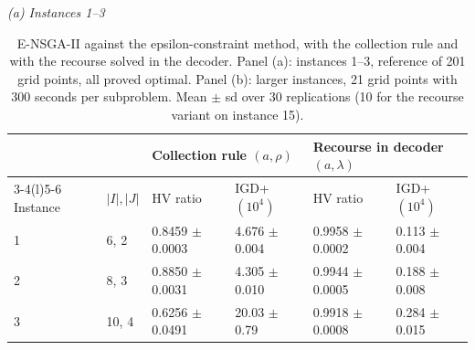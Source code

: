 \documentclass[11pt, a4paper]{article}
\begin{document}
\hypertarget{tab:Exact}{}
\begin{table}[!htb]
\centering
\small
{}
\caption{E-NSGA-II against the epsilon-constraint method, with the collection rule and with the recourse solved in the decoder. Panel (a): instances 1--3, reference of 201 grid points, all proved optimal. Panel (b): larger instances, 21 grid points with 300 seconds per subproblem. Mean $\pm$ sd over 30 replications (10 for the recourse variant on instance 15).}
\label{tab:Exact}
\textit{(a) Instances 1--3}\\[2pt]
\begin{tabular}{@{}llllll@{}}
\toprule
 & & \multicolumn{2}{l}{Collection rule $(a,\rho)$} & \multicolumn{2}{l}{Recourse in decoder $(a,\lambda)$} \\
\cmidrule(lr){3-4}\cmidrule(l){5-6}
Instance & $|I|,|J|$ & HV ratio & IGD+ $(10^{4})$ & HV ratio & IGD+ $(10^{4})$ \\
\midrule
1 & 6, 2  & 0.8459 $\pm$ 0.0003 & 4.676 $\pm$ 0.004 & 0.9958 $\pm$ 0.0002 & 0.113 $\pm$ 0.004 \\
2 & 8, 3  & 0.8850 $\pm$ 0.0031 & 4.305 $\pm$ 0.010 & 0.9944 $\pm$ 0.0005 & 0.188 $\pm$ 0.008 \\
3 & 10, 4 & 0.6256 $\pm$ 0.0491 & 20.03 $\pm$ 0.79 & 0.9918 $\pm$ 0.0008 & 0.284 $\pm$ 0.015 \\
\bottomrule
\end{tabular}


\end{table}
\end{document}
